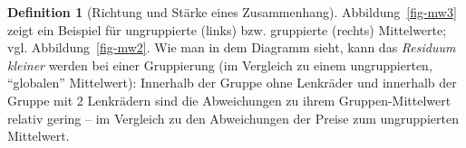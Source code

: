\documentclass[
  a4paper,
  DIV=11]{scrreprt}
\theoremstyle{definition}
\theoremstyle{definition}
\theoremstyle{definition}
\newtheorem{definition}{Definition}[chapter]
\theoremstyle{remark}
\begin{document}
\begin{definition}[Richtung und Stärke eines
Zusammenhang]
Abbildung~\ref{fig-mw3} zeigt ein Beispiel für ungruppierte (links) bzw.
gruppierte (rechts) Mittelwerte; vgl. Abbildung~\ref{fig-mw2}. Wie man
in dem Diagramm sieht, kann das \emph{Residuum kleiner} werden bei einer
Gruppierung (im Vergleich zu einem ungruppierten, ``globalen''
Mittelwert): Innerhalb der Gruppe ohne Lenkräder und innerhalb der
Gruppe mit 2 Lenkrädern sind die Abweichungen zu ihrem
Gruppen-Mittelwert relativ gering -- im Vergleich zu den Abweichungen
der Preise zum ungruppierten Mittelwert.

\begin{figure}

\begin{minipage}{0.50\linewidth}



\end{minipage}%
%
\begin{minipage}{0.50\linewidth}

\end{minipage}
\end{figure}
\end{definition}
\end{document}
